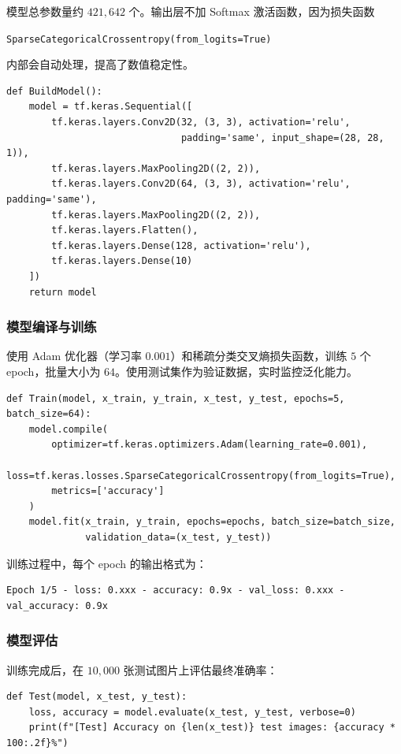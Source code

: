 \documentclass[UTF8]{ctexart}
\begin{document}
模型总参数量约 $421{,}642$ 个。输出层不加 Softmax 激活函数，因为损失函数
\begin{center}
  \texttt{SparseCategoricalCrossentropy(from\_logits=True)}
\end{center}
内部会自动处理，提高了数值稳定性。

\begin{lstlisting}[caption={CNN 模型定义}]
def BuildModel():
    model = tf.keras.Sequential([
        tf.keras.layers.Conv2D(32, (3, 3), activation='relu',
                               padding='same', input_shape=(28, 28, 1)),
        tf.keras.layers.MaxPooling2D((2, 2)),
        tf.keras.layers.Conv2D(64, (3, 3), activation='relu', padding='same'),
        tf.keras.layers.MaxPooling2D((2, 2)),
        tf.keras.layers.Flatten(),
        tf.keras.layers.Dense(128, activation='relu'),
        tf.keras.layers.Dense(10)
    ])
    return model
\end{lstlisting}

\subsubsection{模型编译与训练}

使用 Adam 优化器（学习率 $0.001$）和稀疏分类交叉熵损失函数，训练 $5$ 个 epoch，批量大小为 $64$。使用测试集作为验证数据，实时监控泛化能力。

\begin{lstlisting}[caption={模型训练}]
def Train(model, x_train, y_train, x_test, y_test, epochs=5, batch_size=64):
    model.compile(
        optimizer=tf.keras.optimizers.Adam(learning_rate=0.001),
        loss=tf.keras.losses.SparseCategoricalCrossentropy(from_logits=True),
        metrics=['accuracy']
    )
    model.fit(x_train, y_train, epochs=epochs, batch_size=batch_size,
              validation_data=(x_test, y_test))
\end{lstlisting}

训练过程中，每个 epoch 的输出格式为：
\begin{verbatim}
Epoch 1/5 - loss: 0.xxx - accuracy: 0.9x - val_loss: 0.xxx - val_accuracy: 0.9x
\end{verbatim}

\subsubsection{模型评估}

训练完成后，在 $10{,}000$ 张测试图片上评估最终准确率：

\begin{lstlisting}[caption={测试集评估}]
def Test(model, x_test, y_test):
    loss, accuracy = model.evaluate(x_test, y_test, verbose=0)
    print(f"[Test] Accuracy on {len(x_test)} test images: {accuracy * 100:.2f}%")
\end{lstlisting}
\end{document}
